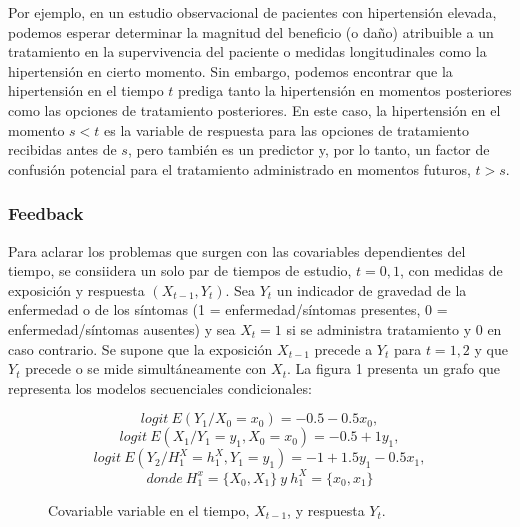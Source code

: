 \documentclass[spanish]{article}
\numberwithin{figure}{subsection}
\numberwithin{equation}{subsection}
\numberwithin{table}{subsection}
\begin{document}
Por ejemplo, en un estudio observacional de pacientes con hipertensión elevada, podemos esperar determinar
la magnitud del beneficio (o daño) atribuible a un tratamiento en la supervivencia del paciente o medidas
longitudinales como la hipertensión en cierto momento. Sin embargo, podemos encontrar que la hipertensión en el tiempo $t$
prediga tanto la hipertensión en momentos posteriores como las opciones de tratamiento posteriores. En este caso,
la hipertensión en el momento $s < t$ es la variable de respuesta para las opciones de tratamiento recibidas antes de $s$,
pero también es un predictor y, por lo tanto, un factor de confusión potencial para el tratamiento administrado
en momentos futuros, $t > s$.

\subsubsection{Feedback}

Para aclarar los problemas que surgen con las covariables dependientes del tiempo, se consiidera un solo par de tiempos de
estudio, $t = 0, 1$, con medidas de exposición y respuesta $(X_{t-1}, Y_t)$. Sea $Y_t$ un indicador de gravedad de la
enfermedad o de los síntomas (1 = enfermedad/síntomas presentes, 0 = enfermedad/síntomas ausentes) y sea $X_t = 1$
si se administra tratamiento y $0$ en caso contrario. Se supone que la exposición $X_{t-1}$ precede a $Y_t$ para
$t = 1, 2$ y que $Y_t$ precede o se mide simultáneamente con $X_t$. La figura 1 presenta un grafo que representa
los modelos secuenciales condicionales:

\begin{equation}
	\label{feedback_1}
	logit \ E(Y_1 / X_0 = x_0) = -0.5 - 0.5x_0,
\end{equation}
\begin{equation}
	\label{feedback_2}
	logit \ E(X_1 / Y_1 = y_1, X_0 = x_0) = -0.5 + 1y_1,
\end{equation}
\begin{equation}
	\label{feedback_3}
	logit \ E(Y_2 / H_1^X = h_1^X, Y_1 = y_1) = -1 + 1.5y_1 - 0.5x_1,
\end{equation}
\[ donde \ H_1^x = \{ X_0, X_1 \} \ y \ h_1^X = \{ x_0, x_1 \} \]

\begin{figure}[h]
\centering
{}
\caption{Covariable variable en el tiempo, $X_{t-1}$, y respuesta $Y_t$.}
\end{figure}
\end{document}
